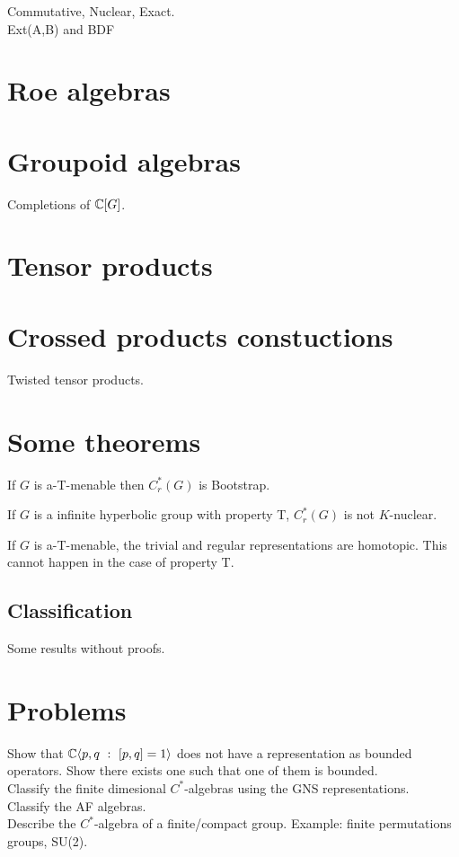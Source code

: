 Commutative, Nuclear, Exact.\\

Ext(A,B) and BDF\\

\section{Roe algebras}

\section{Groupoid algebras}

Completions of $\mathbb C[G]$.

\section{Tensor products}

\section{Crossed products constuctions}

Twisted tensor products.

\section{Some theorems}
\begin{thm}
[Tu] If $G$ is a-T-menable then $C^*_r(G)$ is Bootstrap.
\end{thm}

\begin{thm}
If $G$ is a infinite hyperbolic group with property T, $C^*_r(G)$ is not $K$-nuclear.
\end{thm}

If $G$ is a-T-menable, the trivial and regular representations are homotopic. This cannot happen in the case of property T.\\

\subsection{Classification}

Some results without proofs.

\section{Problems}

Show that $\mathbb C \langle p,q \ : \ [p,q] = 1\rangle $ does not have a representation as bounded operators. Show there exists one such that one of them is bounded.\\

Classify the finite dimesional $C^*$-algebras using the GNS representations.\\

Classify the AF algebras.\\

Describe the $C^*$-algebra of a finite/compact group. Example: finite permutations groups, SU(2).